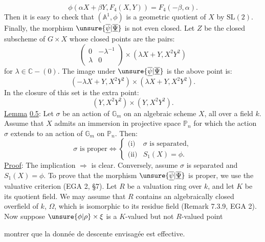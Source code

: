 \[
\phi(\alpha X+\beta Y,F_4(X,Y))=F_4(-\beta,\alpha).
\]
Then it is easy to check that $(\mathbb A^1,\phi)$ is a geometric quotient of $X$ by $\mathrm{SL}(2)$. Finally, the morphism $\unsure{\overline{\underline{\psi}}|\overline{\underline{\Psi}}}$ is not even closed. Let $Z$ be the closed subscheme of $G\times X$ whose closed points are the pairs:
\[
\begin{pmatrix}0&-\lambda^{-1}\\\lambda&0\end{pmatrix}\times(\lambda X+Y,X^2Y^2)
\]
for $\lambda\in\mathbb C-(0)$. The image under $\unsure{\overline{\underline{\psi}}|\overline{\underline{\Psi}}}$ is the above point is:
\[
(-\lambda X+Y,X^2Y^2)\times(\lambda X+Y,X^2Y^2).
\]
In the closure of this set is the extra point:
\[
(Y,X^2Y^2)\times(Y,X^2Y^2).
\]
\uline{Lemma} \uline{0.5}: Let $\sigma$ be an action of $\mathbb G_m$ on an algebraic scheme $X$, all over a field $k$. Assume that $X$ admits an immersion in projective space $\mathbb P_n$ for which the action $\sigma$ extends to an action of $\mathbb G_m$ on $\mathbb P_n$. Then:
\[
\sigma\text{ is proper}\Longleftrightarrow\begin{cases}\text{(i)}&\sigma\text{ is separated},\\\text{(ii)}&S_1(X)=\phi.\end{cases}
\]
\uline{Proof}: The implication $\Longrightarrow$ is clear. Conversely, assume $\sigma$ is separated and $S_1(X)=\phi$. To prove that the morphism $\unsure{\overline{\underline{\psi}}|\overline{\underline{\Psi}}}$ is proper, we use the valuative criterion (EGA 2, \S7). Let $R$ be a valuation ring over $k$, and let $K$ be its quotient field. We may assume that $R$ contains an algebraically closed overfield of $k$, $\Omega$, which is isomorphic to its residue field (Remark 7.3.9, EGA 2). Now suppose $\unsure{\phi|\rho}\times\xi$ is a $K$-valued but not $R$-valued point

montrer que la donnée de descente envisagée est effective.

